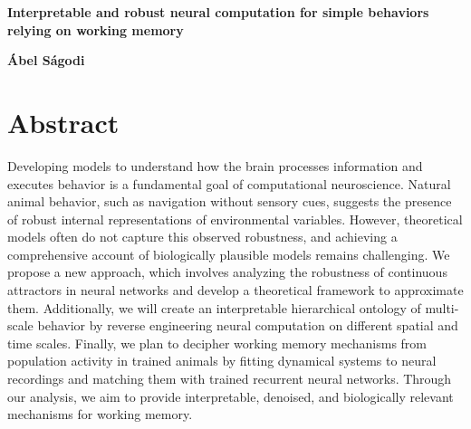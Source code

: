 \documentclass[12pt,letterpaper, onecolumn]{article}
\theoremstyle{definition}
\theoremstyle{remark}
\begin{document}

\begin{center}
\LARGE{\bf  Interpretable and robust neural computation for simple behaviors relying on working memory}
\end{center}
\begin{center}
{\textbf{\'Abel S\'agodi}}
\end{center}

\section*{Abstract}
Developing models to understand how the brain processes information and executes behavior is a fundamental goal of computational neuroscience.
 Natural animal behavior, such as navigation without sensory cues, suggests the presence of robust internal representations of environmental variables.
  However, theoretical models often do not capture this observed robustness, and achieving a comprehensive account of biologically plausible models remains challenging. 
We propose a new approach, which involves analyzing the robustness of continuous attractors in neural networks and develop a theoretical framework to approximate them.
 Additionally, we will create an interpretable hierarchical ontology of multi-scale behavior by reverse engineering neural computation on different spatial and time scales.
  Finally, we plan to decipher working memory mechanisms from population activity in trained animals by fitting dynamical systems to neural recordings and matching them with trained recurrent neural networks.
   Through our analysis, we aim to provide interpretable, denoised, and biologically relevant mechanisms for working memory.
\end{document}
